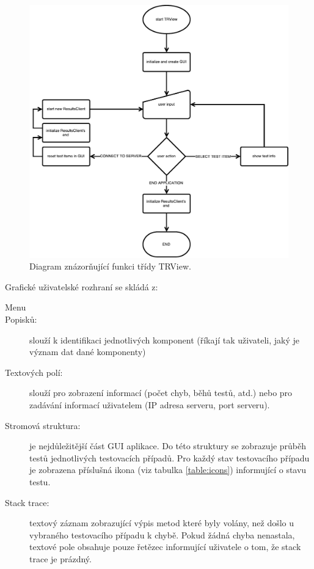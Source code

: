       \begin{figure}[h]
	\includegraphics[width=\textwidth, height=\textheight, keepaspectratio, center]{obrazky-figures/trview_trview_flowchart.pdf}
	\caption{Diagram znázorňující funkci třídy TRView.}
	\label{fig:trview_flowchart}
      \end{figure}


      \noindent Grafické uživatelské rozhraní se skládá z:
      \begin{description}
	 \item[Menu] 
	 \item[Popisků:] slouží k identifikaci jednotlivých komponent (říkají tak uživateli, jaký je význam dat dané komponenty)
	 \item[Textových polí:] slouží pro zobrazení informací (počet chyb, běhů testů, atd.) nebo pro zadávání informací uživatelem (IP adresa serveru, port serveru).
	 \item[Stromová struktura:] je nejdůležitější část GUI aplikace. Do této struktury se zobrazuje průběh testů jednotlivých testovacích případů. Pro každý stav testovacího případu je zobrazena příslušná ikona (viz tabulka \ref{table:icons}) informující o stavu testu.
	 \item[Stack trace:] textový záznam zobrazující výpis metod které byly volány, než došlo u vybraného testovacího případu k chybě. Pokud žádná chyba nenastala, textové pole obsahuje pouze řetězec informující uživatele o tom, že stack trace je prázdný.
      \end{description}
      
